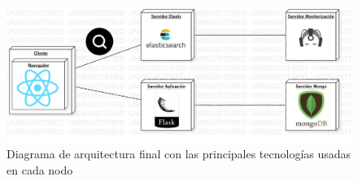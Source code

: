 \begin{figure}[ht]
	
	\centering
	\includegraphics[width=\linewidth]{imagenes/achitecture}
	\caption{Diagrama de arquitectura final con las principales tecnologías usadas en cada nodo}
	\label{fig:finalArchitecture}
\end{figure}